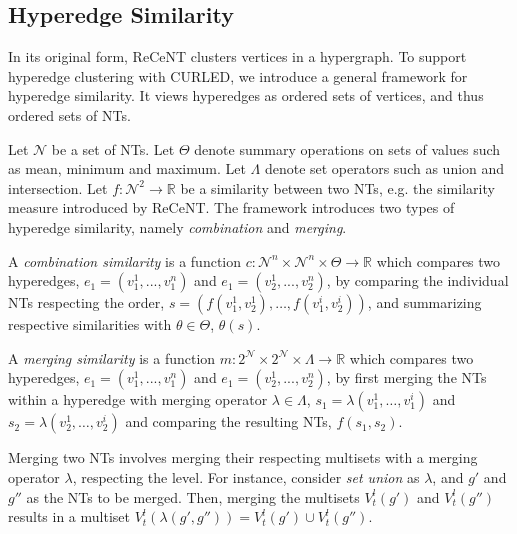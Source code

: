 

\subsection{Hyperedge Similarity}

In its original form, ReCeNT clusters vertices in a hypergraph.
To support hyperedge clustering with CURLED, we introduce a general framework for hyperedge similarity.
It views hyperedges as ordered sets of vertices, and thus ordered sets of NTs.


Let $\mathcal{N}$ be a set of NTs.
Let $\Theta$ denote summary operations on sets of values such as mean, minimum and maximum.
Let $\Lambda$ denote set operators such as union and intersection.
Let $f: \mathcal{N}^2 \rightarrow \mathbb{R}$ be a similarity between two NTs, e.g. the similarity measure introduced by ReCeNT.
The framework introduces two types of hyperedge similarity, namely \textit{combination} and \textit{merging}.


\begin{definition}
A \textit{combination similarity} is a function $c: \mathcal{N}^n \times \mathcal{N}^n \times \Theta \rightarrow \mathbb{R}$ which compares two hyperedges, $e_1 = (v_1^1,..., v_1^n)$ and $e_1 = (v_2^1,..., v_2^n)$, by comparing the individual NTs respecting the order, $s = \left(f(v_1^1,v_2^1),\ldots,f(v_1^i,v_2^i) \right)$, and summarizing respective similarities with $\theta \in \Theta$,  $\theta(s)$. 
\end{definition}

\begin{definition}
A \textit{merging similarity} is a function $m: 2^{\mathcal{N}} \times 2^{\mathcal{N}} \times \Lambda \rightarrow \mathbb{R}$ which compares two hyperedges, $e_1 = (v_1^1,..., v_1^n)$ and $e_1 = (v_2^1,..., v_2^n)$, by first merging the NTs within a hyperedge with merging operator $\lambda \in \Lambda$, $s_1 = \lambda (v_1^1,\ldots,v_1^i)$ and $s_2 = \lambda (v_2^1,\ldots,v_2^i)$ and comparing the resulting NTs, $f(s_1,s_2)$.  
\end{definition}


Merging two NTs involves merging their respecting multisets with a merging operator $\lambda$, respecting the level.
For instance, consider \textit{set union} as $\lambda$, and $g'$ and $g''$ as the NTs to be merged.
Then, merging the multisets $V^l_{t}(g')$ and $V^l_{t}(g'')$ results in a multiset $V^l_{t}\left(\lambda(g',g'')\right) = V^l_{t}(g') \cup V^l_{t}(g'')$.




